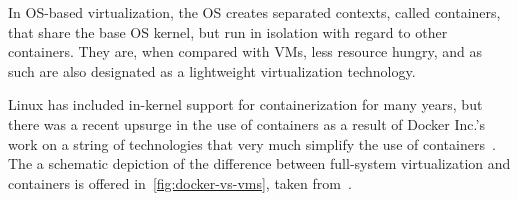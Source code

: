 In OS-based virtualization, the OS creates separated contexts, called containers, that share the base OS kernel, but run in isolation with regard to other containers.
They are, when compared with VMs, less resource hungry, and as such are also designated as a lightweight virtualization technology.

Linux has included in-kernel support for containerization for many years, but there was a recent upsurge in the use of containers as a result of Docker Inc.'s work on a string of technologies that very much simplify the use of containers~\cite{hwswvirt,virtessentials}.
The a schematic depiction of the difference between full-system virtualization and containers is offered in~\ref{fig:docker-vs-vms}, taken from~\cite{dockercontreplacingvms}.








